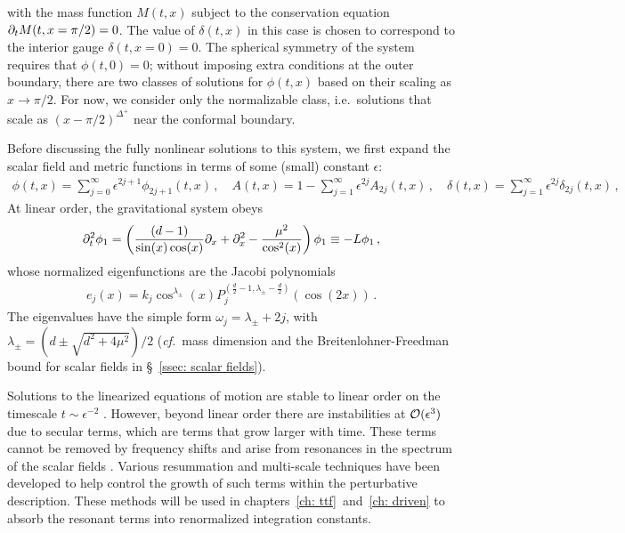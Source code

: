 \documentclass[../PhD.tex]{subfiles}
\begin{document}
with the mass function $M(t,x)$ subject to the conservation equation $\partial_t M( t, x = \pi/2) = 0$. The value of $\delta(t,x)$ in this case is chosen to correspond to the interior gauge $\delta(t,x=0) = 0$. The spherical symmetry of the system requires that $\phi (t, 0) = 0$; without imposing extra conditions at the outer boundary, there are two classes of solutions for $\phi(t,x)$ based on their scaling as $x \to \pi/2$. For now, we consider only the normalizable class, i.e.~solutions that scale as $(x - \pi/2)^{\Delta^+}$ near the conformal boundary.

Before discussing the fully nonlinear solutions to this system, we first expand the scalar field and metric functions in terms of some (small) constant $\epsilon$:
\begin{align}
\phi(t,x) = \sum_{j=0}^{\infty} \epsilon^{2j + 1} \phi_{2j + 1} (t,x) \, , \quad A(t,x) = 1 - \sum_{j=1}^\infty \epsilon^{2j} A_{2j} (t,x) \, , \quad \delta(t,x) = \sum_{j=1}^\infty \epsilon^{2j} \delta_{2j} (t,x) \, ,
\end{align}
At linear order, the gravitational system obeys
\begin{align}
\label{collapse eigen eqn}
\partial_t^2 \phi_1 = \left( \frac{ (d-1)}{\sin (x) \cos (x)} \partial_x + \partial^2_x - \frac{\mu^2}{\cos^2 (x)} \right) \phi_1 \equiv - L \phi_1 \, ,
\end{align}
whose normalized eigenfunctions are the Jacobi polynomials
\begin{align}
\label{scalar eigens}
e_j (x) = k_j \cos^{\lambda_\pm}(x) P_j^{(\frac{d}{2} - 1, \lambda_\pm - \frac{d}{2})} \left( \cos \left( 2x \right)\right) \, .
\end{align}
The eigenvalues have the simple form $\omega_j = \lambda_\pm + 2j$, with $\lambda_\pm = (d \pm \sqrt{d^2 + 4\mu^2})/2$ ({\it cf.}~mass dimension and the Breitenlohner-Freedman bound for scalar fields in \S~\!\ref{ssec: scalar fields}). 

Solutions to the linearized equations of motion are stable to linear order on the timescale $t \sim \epsilon^{-2}$ \cite{1506.07907}. However, beyond linear order there are instabilities at $\mathcal O(\epsilon^3)$ due to secular terms, which are terms that grow larger with time. These terms cannot be removed by frequency shifts and arise from resonances in the spectrum of the scalar fields \cite{1407.6273}. Various resummation \cite{hep-th/9506161} and multi-scale techniques \cite{1403.6471} have been developed to help control the growth of such terms within the perturbative description. These methods will be used in chapters~\ref{ch: ttf}~and~\ref{ch: driven} to absorb the resonant terms into renormalized integration constants.
\end{document}
